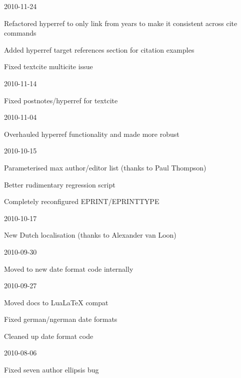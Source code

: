 \documentclass{ltxdockit}
\begin{document}
\begin{changelog}
\begin{release}{2.5}{2010-11-24}
\item Refactored hyperref to only link from years to make it
  consistent across cite commands
\item Added hyperref target references section for citation examples
\item Fixed textcite multicite issue
\end{release}

\begin{release}{2.4}{2010-11-14}
\item Fixed postnotes/hyperref for textcite
\end{release}

\begin{release}{2.3}{2010-11-04}
\item Overhauled hyperref functionality and made more robust
\end{release}

\begin{release}{2.2}{2010-10-15}
\item Parameterised max author/editor list (thanks to Paul Thompson)
\item Better rudimentary regression script
\item Completely reconfigured EPRINT/EPRINTTYPE
\end{release}

\begin{release}{2.1}{2010-10-17}
\item New Dutch localisation (thanks to Alexander van Loon)
\end{release}

\begin{release}{2.0}{2010-09-30}
\item Moved to new date format code internally
\end{release}

\begin{release}{1.9}{2010-09-27}
\item Moved docs to LuaLaTeX compat
\item Fixed german/ngerman date formats
\item Cleaned up date format code
\end{release}

\begin{release}{1.8}{2010-08-06}
\item Fixed seven author ellipsis bug
\end{release}


\end{changelog}
\end{document}
